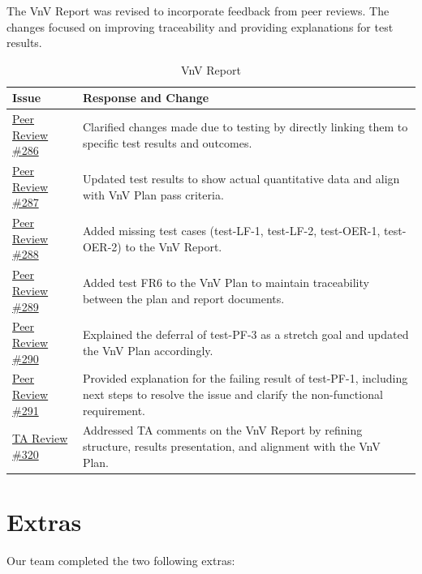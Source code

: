 \documentclass{article}
\begin{document}
The VnV Report was revised to incorporate feedback from peer reviews. The changes focused on improving traceability and providing explanations for test results.

\begin{table}[H]
\caption{VnV Report}
\begin{tabularx}{\textwidth}{p{4cm}X}
  \toprule
  \textbf{Issue} & \textbf{Response and Change} \\
  \midrule
  \href{https://github.com/speech-buddies/VoiceBridge/issues/286}{Peer Review \#286} & Clarified changes made due to testing by directly linking them to specific test results and outcomes. \\
  \midrule
  \href{https://github.com/speech-buddies/VoiceBridge/issues/287}{Peer Review \#287} & Updated test results to show actual quantitative data and align with VnV Plan pass criteria. \\
  \midrule
  \href{https://github.com/speech-buddies/VoiceBridge/issues/288}{Peer Review \#288} & Added missing test cases (test-LF-1, test-LF-2, test-OER-1, test-OER-2) to the VnV Report. \\
  \midrule
  \href{https://github.com/speech-buddies/VoiceBridge/issues/289}{Peer Review \#289} & Added test FR6 to the VnV Plan to maintain traceability between the plan and report documents. \\
  \midrule
  \href{https://github.com/speech-buddies/VoiceBridge/issues/290}{Peer Review \#290} & Explained the deferral of test-PF-3 as a stretch goal and updated the VnV Plan accordingly. \\
  \midrule
  \href{https://github.com/speech-buddies/VoiceBridge/issues/291}{Peer Review \#291} & Provided explanation for the failing result of test-PF-1, including next steps to resolve the issue and clarify the non-functional requirement. \\
  \midrule
  \href{https://github.com/speech-buddies/VoiceBridge/issues/320}{TA Review \#320} & Addressed TA comments on the VnV Report by refining structure, results presentation, and alignment with the VnV Plan. \\
  \bottomrule
\end{tabularx}
\end{table}

\section{Extras}

Our team completed the two following extras:
\end{document}
